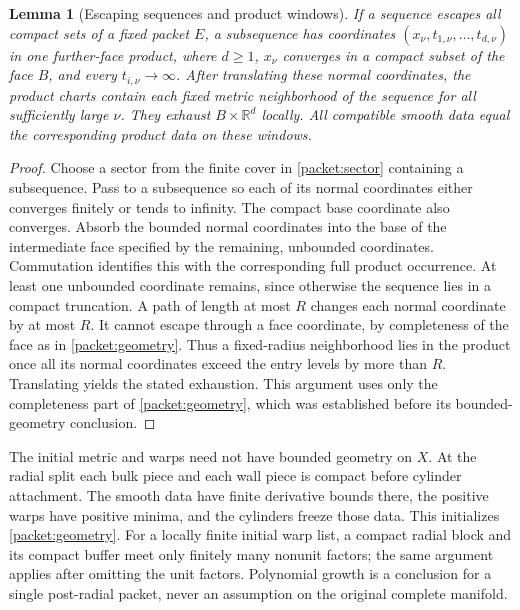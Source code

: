 \documentclass[11pt]{article}
\numberwithin{equation}{section}
\newtheorem{lemma}[theorem]{Lemma}
\theoremstyle{definition}
\theoremstyle{remark}
\begin{document}
\begin{lemma}[Escaping sequences and product windows]\label{packet:escape}
If a sequence escapes all compact sets of a fixed packet $E$, a
subsequence has coordinates $(x_\nu,t_{1,\nu},\ldots,t_{d,\nu})$
in one further-face product, where $d\ge1$, $x_\nu$ converges in a
compact subset of the face $B$, and every $t_{i,\nu}\to\infty$.
After translating these normal coordinates, the product charts contain
each fixed metric neighborhood of the sequence for all sufficiently
large $\nu$.  They exhaust $B\times\mathbb R^d$ locally.  All compatible
smooth data equal the corresponding product data on these windows.
\end{lemma}

\begin{proof}
Choose a sector from the finite cover in
\cref{packet:sector} containing a subsequence.  Pass to a subsequence
so each of its normal coordinates either converges finitely or tends
to infinity.  The compact base coordinate also converges.  Absorb the
bounded normal coordinates into the base of the intermediate face
specified by the remaining, unbounded coordinates.  Commutation
identifies this with the corresponding full product occurrence.
At least one unbounded coordinate remains, since otherwise the
sequence lies in a compact truncation.  A path of length at most $R$
changes each normal coordinate by at most $R$.  It cannot escape
through a face coordinate, by completeness of the face as in
\cref{packet:geometry}.  Thus a fixed-radius neighborhood lies in the
product once all its normal coordinates exceed the entry levels by
more than $R$.  Translating yields the stated exhaustion.  This
argument uses only the completeness part of \cref{packet:geometry},
which was established before its bounded-geometry conclusion.
\end{proof}

The initial metric and warps need not have bounded geometry on $X$.
At the radial split each bulk piece and each wall piece is compact
before cylinder attachment.  The smooth data have finite derivative
bounds there, the positive warps have positive minima, and the
cylinders freeze those data.  This initializes \cref{packet:geometry}.
For a locally finite initial warp list, a compact radial block and its
compact buffer meet only finitely many nonunit factors; the same
argument applies after omitting the unit factors.  Polynomial growth
is a conclusion for a single post-radial packet, never an assumption
on the original complete manifold.
\end{document}
